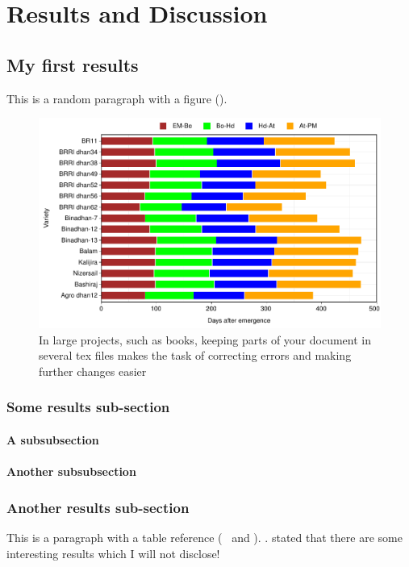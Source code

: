 \documentclass[12pt, oneside]{book}
\begin{document}
\chapter{Results and Discussion}


\section{My first results}
	This is a random paragraph with a figure (). \lipsum*[3-4]
	
	\begin{figure}[]
		\includegraphics[width=\textwidth]{figures/figR1.pdf}
		\caption{In large projects, such as books, keeping parts of your document in several tex files makes the task of correcting errors and making further changes easier}
		\label{figR1}
	\end{figure}
	
	\subsection{Some results sub-section}
	\lipsum*[1-2]
	\subsubsection{A subsubsection}
			\lipsum*[4]
	\subsubsection{Another subsubsection}
			\lipsum*[5]
	
	\subsection{Another results sub-section}
	This is a paragraph with a table reference (~ and ). \lipsum*[6]. \textcite{Moradi2020} stated that there are some interesting results which I will not disclose!
	
\end{document}
